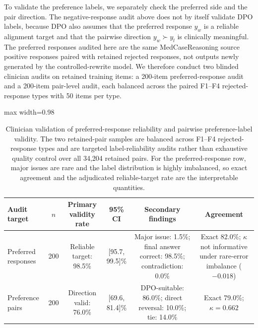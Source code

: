 \documentclass[a4paper,fleqn,doubleblind]{cas-sc}
\begin{document}
To validate the preference labels, we separately check the preferred side and the pair direction. The negative-response audit above does not by itself validate DPO labels, because DPO also assumes that the preferred response $y_w$ is a reliable alignment target and that the pairwise direction $y_w \succ y_l$ is clinically meaningful. The preferred responses audited here are the same MedCaseReasoning source positive responses paired with retained rejected responses, not outputs newly generated by the controlled-rewrite model. We therefore conduct two blinded clinician audits on retained training items: a 200-item preferred-response audit and a 200-item pair-level audit, each balanced across the paired F1--F4 rejected-response types with 50 items per type.

\begin{table}[htbp]
    \centering
    \footnotesize
    \caption{Clinician validation of preferred-response reliability and pairwise preference-label validity. The two retained-pair samples are balanced across F1--F4 rejected-response types and are targeted label-reliability audits rather than exhaustive quality control over all 34,204 retained pairs. For the preferred-response row, major issues are rare and the label distribution is highly imbalanced, so exact agreement and the adjudicated reliable-target rate are the interpretable quantities.}
    \label{tab:preference_label_audit}
    \begin{adjustbox}{max width=0.98\textwidth}
    \begin{tabular}{lccccc}
        \toprule
        \textbf{Audit target} & \textbf{$n$} & \textbf{Primary validity rate} & \textbf{95\% CI} & \textbf{Secondary findings} & \textbf{Agreement} \\
        \midrule
        Preferred responses & 200 & Reliable target: 98.5\% & [95.7, 99.5]\% & Major issue: 1.5\%; final answer correct: 98.5\%; contradiction: 0.0\% & Exact 82.0\%; $\kappa$ not informative under rare-error imbalance ($-0.018$) \\
        Preference pairs & 200 & Direction valid: 76.0\% & [69.6, 81.4]\% & DPO-suitable: 86.0\%; direct reversal: 10.0\%; tie: 14.0\% & Exact 79.0\%; $\kappa=0.662$ \\
        \bottomrule
    \end{tabular}
    \end{adjustbox}
\end{table}
\end{document}
